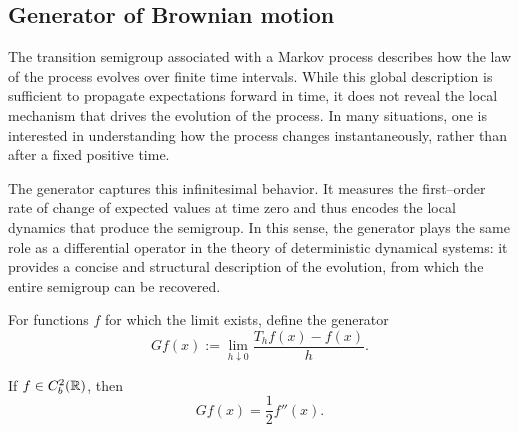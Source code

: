 \subsection{Generator of Brownian motion}
The transition semigroup associated with a Markov process describes how the law of the
process evolves over finite time intervals. While this global description is sufficient
to propagate expectations forward in time, it does not reveal the local mechanism that
drives the evolution of the process. In many situations, one is interested in
understanding how the process changes instantaneously, rather than after a fixed positive
time.

The generator captures this infinitesimal behavior. It measures the first--order rate of
change of expected values at time zero and thus encodes the local dynamics that produce
the semigroup. In this sense, the generator plays the same role as a differential operator
in the theory of deterministic dynamical systems: it provides a concise and structural
description of the evolution, from which the entire semigroup can be recovered.

\begin{definition}
For functions $f$ for which the limit exists, define the generator
\[
Gf(x) := \lim_{h\downarrow0} \frac{T_h f(x)-f(x)}{h}.
\]    
\end{definition}


\begin{proposition}[Proposition 3.1]
If $f\in C_b^2(\mathbb{R})$, then
\[
Gf(x)=\frac12 f''(x).
\]
\end{proposition}

